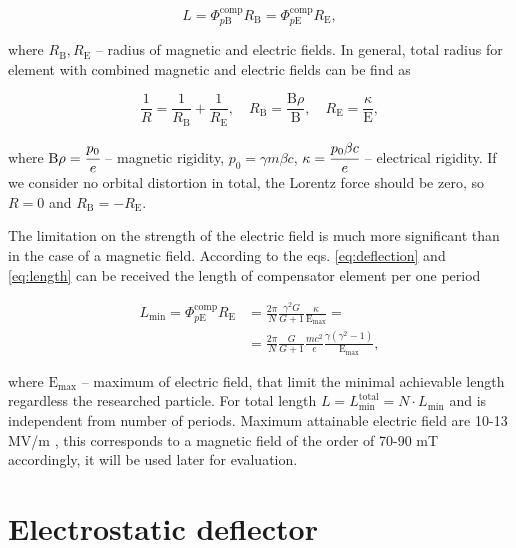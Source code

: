 \documentclass[a4paper,
               keeplastbox,   %
               ]{jacow}
\begin{document}
\begin{equation}
	L = \Phi_{p\mathrm{B}}^{\text{comp}}R_{\mathrm{B}} = \Phi_{p\mathrm{E}}^{\text{comp}}R_{\mathrm{E}},
	\label{eq:length}
\end{equation}

\noindent where $R_{\mathrm{B}}, R_{\mathrm{E}}$ -- radius of magnetic and electric fields. In general, total radius for element with combined magnetic and electric fields can be find as

\begin{equation}
	\frac{1}{R} = \frac{1}{R_{\mathrm{B}}}+\frac{1}{R_{\mathrm{E}}}, \quad R_{\mathrm{B}}=\frac{\mathrm{B}\rho}{\mathrm{B}}, \quad R_{\mathrm{E}}=\frac{\kappa}{\mathrm{E}},    
	\label{eq:total_radius}
\end{equation}

\noindent where $\mathrm{B}\rho = \cfrac{p_{0}}{e}$ -- magnetic rigidity, $p_{0} = \gamma m\beta c$, $\kappa = \cfrac{p_{0}\beta c}{e}$ -- electrical rigidity. If we consider no orbital distortion in total, the Lorentz force should be zero, so $R=0$ and $R_{\mathrm{B}} = -R_{\mathrm{E}}$.

The limitation on the strength of the electric field is much more significant than in the case of a magnetic field. According to the eqs. \ref{eq:deflection} and \ref{eq:length} can be received the length of compensator element per one period

\begin{equation}
	\begin{aligned}
		L_{\text{min}} = \Phi_{p\mathrm{E}}^{\text{comp}}R_{\mathrm{E}} & = 
		\frac{2\pi}{N}\frac{\gamma^2 G}{G+1}\frac{\kappa}{\mathrm{E}_{\text{max}}} = \\
		& = \frac{2\pi}{N}\frac{G}{G+1}\frac{mc^2}{e}\frac{\gamma(\gamma^2-1)}{\mathrm{E}_{\text{max}}},
		\label{eq:length_min}
	\end{aligned}
\end{equation}

\noindent where $\mathrm{E}_{\text{max}}$ -- maximum of electric field, that limit the minimal achievable length regardless the researched particle. For total length $L=L_{\text{min}}^{\text{total}} = N\cdot L_{\text{min}}$ and is independent from number of periods. Maximum attainable electric field are 10-13 MV/m \cite{wien}, this corresponds to a magnetic field of the order of 70-90 mT accordingly, it will be used later for evaluation.

\section{Electrostatic deflector}
\end{document}
